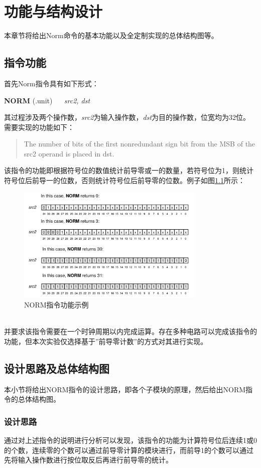 \chapter{功能与结构设计}
本章节将给出Norm命令的基本功能以及全定制实现的总体结构图等。
\section{指令功能}
\indent  首先Norm指令具有如下形式：
\begin{center}
\textbf{NORM} (.unit)  $\quad$ \textit{src2, dst}
\end{center}
其过程涉及两个操作数，\textit{src2}为输入操作数，\textit{dst}为目的操作数，位宽均为32位。需要实现的功能如下：
\begin{quote}
The number of bits of the first nonredundant sign bit from the MSB of the src2
operand is placed in dst.
\end{quote}

\indent 该指令的功能即根据符号位的数值统计前导零或一的数量，若符号位为1，则统计符号位后前导一的位数，否则统计符号位后前导零的位数。例子如图\ref{fig1.1}所示：
\begin{figure}[!hbpt]
\centering
\includegraphics[width=0.8\textwidth]{chapter1/Norm_Example1}
\caption{NORM指令功能示例}
\label{fig1.1}
\end{figure}\\
并要求该指令需要在一个时钟周期以内完成运算。存在多种电路可以完成该指令的功能，但本次实验仅选择基于''前导零计数''的方式对其进行实现。
\section{设计思路及总体结构图}
本小节将给出NORM指令的设计思路，即各个子模块的原理，然后给出NORM指令的总体结构图。
\subsection{设计思路}
通过对上述指令的说明进行分析可以发现，该指令的功能为计算符号位后连续1或0的个数，连续零的个数可以通过前导零计算的模块进行，而前导1的个数可以通过先将输入操作数进行按位取反后再进行前导零的统计。
